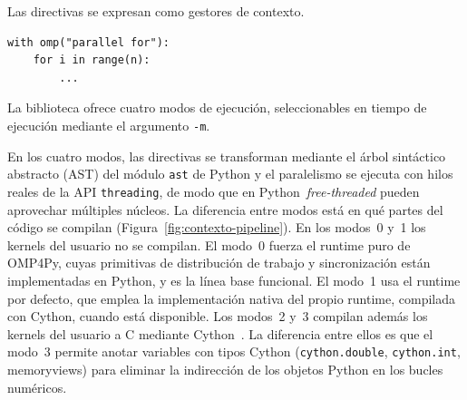 Las directivas se expresan como gestores de contexto.

\begin{verbatim}
with omp("parallel for"):
    for i in range(n):
        ...
\end{verbatim}

La biblioteca ofrece cuatro modos de ejecución, seleccionables en tiempo de
ejecución mediante el argumento \texttt{-m}.

\begin{center}
\end{center}

En los cuatro modos, las directivas se transforman mediante el árbol sintáctico
abstracto (AST) del módulo \texttt{ast} de Python y el paralelismo se ejecuta
con hilos reales de la API \texttt{threading}, de modo que en
Python~\emph{free-threaded} pueden aprovechar múltiples núcleos. La diferencia
entre modos está en qué partes del código se compilan
(Figura~\ref{fig:contexto-pipeline}). En los modos~0 y~1 los kernels del
usuario no se compilan. El modo~0 fuerza el runtime puro de OMP4Py, cuyas
primitivas de distribución de trabajo y sincronización están implementadas en
Python, y es la línea base funcional. El modo~1 usa el runtime por
defecto, que emplea la implementación nativa del propio runtime, compilada con
Cython, cuando está disponible. Los modos~2 y~3 compilan además los kernels del
usuario a C mediante Cython~\cite{Cython2011}. La
diferencia entre ellos es que el modo~3 permite anotar variables con tipos
Cython (\texttt{cython.double}, \texttt{cython.int}, memoryviews) para eliminar
la indirección de los objetos Python en los bucles numéricos.

